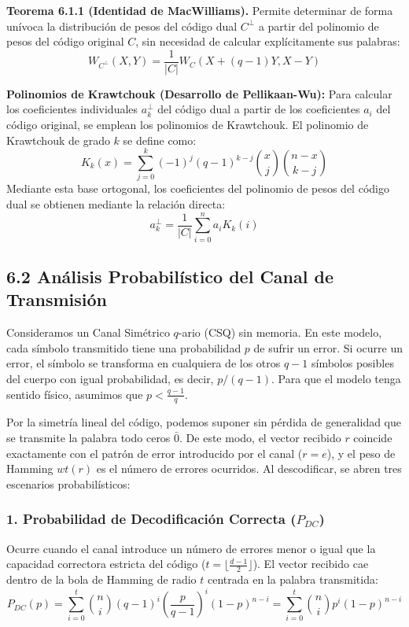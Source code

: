 \documentclass{article}
\begin{document}
\textbf{Teorema 6.1.1 (Identidad de MacWilliams).}
Permite determinar de forma unívoca la distribución de pesos del código dual $C^{\perp}$ a partir del polinomio de pesos del código original $C$, sin necesidad de calcular explícitamente sus palabras:
\[
W_{C^{\perp}}(X, Y) = \frac{1}{|C|} W_C(X + (q-1)Y, X - Y)
\]

\textbf{Polinomios de Krawtchouk (Desarrollo de Pellikaan-Wu):}
Para calcular los coeficientes individuales $a_k^\perp$ del código dual a partir de los coeficientes $a_i$ del código original, se emplean los polinomios de Krawtchouk. El polinomio de Krawtchouk de grado $k$ se define como:
\[
K_k(x) = \sum_{j=0}^k (-1)^j (q-1)^{k-j} \binom{x}{j} \binom{n-x}{k-j}
\]
Mediante esta base ortogonal, los coeficientes del polinomio de pesos del código dual se obtienen mediante la relación directa:
\[
a_k^\perp = \frac{1}{|C|} \sum_{i=0}^n a_i K_k(i)
\]

\subsection{6.2 Análisis Probabilístico del Canal de Transmisión}

Consideramos un Canal Simétrico $q$-ario (CSQ) sin memoria. En este modelo, cada símbolo transmitido tiene una probabilidad $p$ de sufrir un error. Si ocurre un error, el símbolo se transforma en cualquiera de los otros $q-1$ símbolos posibles del cuerpo con igual probabilidad, es decir, $p/(q-1)$. Para que el modelo tenga sentido físico, asumimos que $p < \frac{q-1}{q}$.

Por la simetría lineal del código, podemos suponer sin pérdida de generalidad que se transmite la palabra todo ceros $\bar{0}$. De este modo, el vector recibido $r$ coincide exactamente con el patrón de error introducido por el canal ($r = e$), y el peso de Hamming $wt(r)$ es el número de errores ocurridos. Al descodificar, se abren tres escenarios probabilísticos:

\subsubsection{1. Probabilidad de Decodificación Correcta ($P_{DC}$)}
Ocurre cuando el canal introduce un número de errores menor o igual que la capacidad correctora estricta del código ($t = \lfloor \frac{d-1}{2} \rfloor$). El vector recibido cae dentro de la bola de Hamming de radio $t$ centrada en la palabra transmitida:
\[
P_{DC}(p) = \sum_{i=0}^t \binom{n}{i} (q - 1)^i \left( \frac{p}{q-1} \right)^i (1-p)^{n-i} = \sum_{i=0}^t \binom{n}{i} p^i (1-p)^{n-i}
\]
\end{document}
